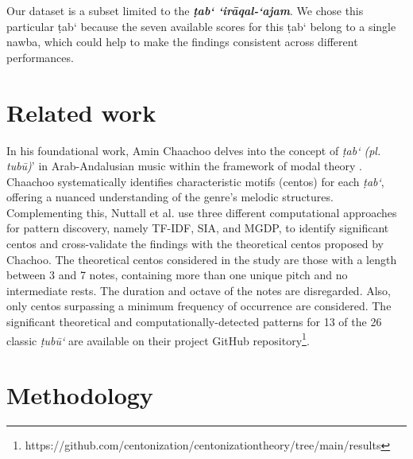 \documentclass{article}
\begin{document}
Our dataset is a subset limited to the \textbf{\textit{ṭab‘ ‘irāqal-‘ajam}}. We chose this particular ṭab‘ because the seven available scores for this ṭab‘ belong to a single nawba, which could help to make the findings consistent across different performances.

\section{Related work}\label{sec:related_work}

In his foundational work, Amin Chaachoo delves into the concept of \textit{ṭab‘ (pl. tubū)}’ in Arab-Andalusian music within the framework of modal theory \cite{Chaachoo2011}. Chaachoo systematically identifies characteristic motifs (centos) for each \textit{ṭab‘}, offering a nuanced understanding of the genre's melodic structures. Complementing this, Nuttall et al. \cite{Nuttall2021} use three different computational approaches for pattern discovery, namely TF-IDF, SIA, and MGDP, to identify significant centos and cross-validate the findings with the theoretical centos proposed by Chachoo. The theoretical centos considered in the study are those with a length between 3 and 7 notes, containing more than one unique pitch and no intermediate rests. The duration and octave of the notes are disregarded. Also, only centos surpassing a minimum frequency of occurrence are considered. The significant theoretical and computationally-detected patterns for 13 of the 26 classic \textit{ṭubū‘} are available on their project GitHub repository\footnote{https://github.com/centonization/centonizationtheory/tree/main/results}.

\section{Methodology}\label{sec:Methodology}
\end{document}

